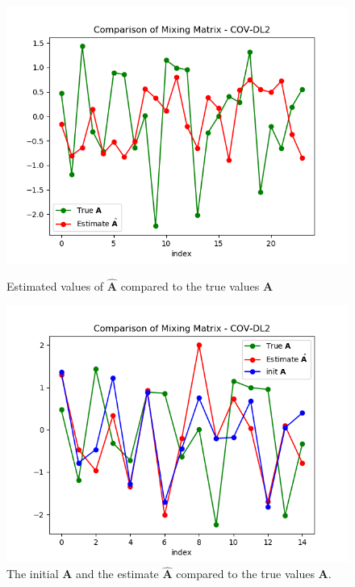 \begin{figure}[h]
    \begin{minipage}[t]{.45\textwidth}
		\centering
		\includegraphics[scale=0.5]{figures/ch_6/COV1_simple.png}
		\caption{Estimated values of $\hat{\textbf{A}}$ compared to the true 				values $\textbf{A}$}
		\label{fig:cov1_simple}
    \end{minipage} 
    \hfill
    \begin{minipage}[t]{.45\textwidth}
        \centering
		\includegraphics[scale=0.5]{figures/ch_6/COV2_simple.png}
		\caption{The initial $\textbf{A}$ and the estimate $\hat{\textbf{A}}$ 				compared to the true values $\textbf{A}$. }
		\label{fig:cov2_simple}
    \end{minipage}
\end{figure}


